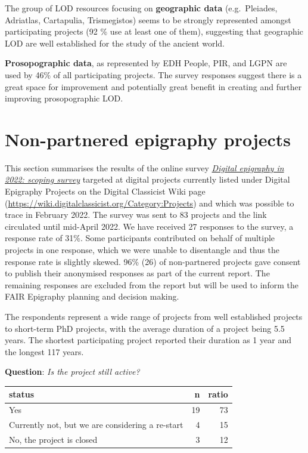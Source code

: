\documentclass[
  12pt,
]{scrreprt}
\begin{document}
\normalsize

The group of LOD resources focusing on \textbf{geographic data}
(e.g.~Pleiades, Adriatlas, Cartapulia, Trismegistos) seems to be
strongly represented amongst participating projects (92 \% use at least
one of them), suggesting that geographic LOD are well established for
the study of the ancient world.

\textbf{Prosopographic data}, as represented by EDH People, PIR, and
LGPN are used by 46\% of all participating projects. The survey
responses suggest there is a great space for improvement and potentially
great benefit in creating and further improving prosopographic LOD.

\hypertarget{non-partnered-epigraphy-projects}{%
\chapter{Non-partnered epigraphy
projects}\label{non-partnered-epigraphy-projects}}

This section summarises the results of the online survey
\href{https://github.com/FAIR-epigraphy/scoping_survey_report/data/02_Survey_projects_questions.pdf}{\emph{Digital
epigraphy in 2022: scoping survey}} targeted at digital projects
currently listed under Digital Epigraphy Projects on the Digital
Classicist Wiki page
(\url{https://wiki.digitalclassicist.org/Category:Projects}) and which
was possible to trace in February 2022. The survey was sent to 83
projects and the link circulated until mid-April 2022. We have received
27 responses to the survey, a response rate of 31\%. Some participants
contributed on behalf of multiple projects in one response, which we
were unable to disentangle and thus the response rate is slightly
skewed. 96\% (26) of non-partnered projects gave consent to publish
their anonymised responses as part of the current report. The remaining
responses are excluded from the report but will be used to inform the
FAIR Epigraphy planning and decision making.

The respondents represent a wide range of projects from well established
projects to short-term PhD projects, with the average duration of a
project being 5.5 years. The shortest participating project reported
their duration as 1 year and the longest 117 years.

\textbf{Question}: \emph{Is the project still active?}

\footnotesize

\begin{longtable}[]{@{}lrr@{}}
\toprule
status & n & ratio \\
\midrule
\endhead
Yes & 19 & 73 \\
Currently not, but we are considering a re-start & 4 & 15 \\
No, the project is closed & 3 & 12 \\
\bottomrule
\end{longtable}
\end{document}
